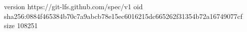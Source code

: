 version https://git-lfs.github.com/spec/v1
oid sha256:0884f465384b70c7a9abcb78e15ec6016215dc665262f31354b72a16749077cf
size 108251
